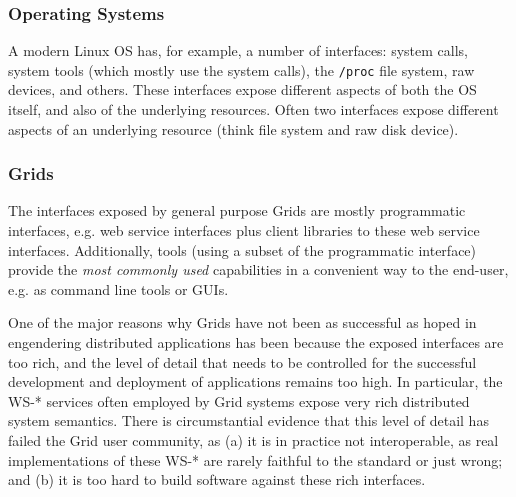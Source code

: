 \documentclass[conference,final]{IEEEtran}
\newcommand{\I}[1]{\textit{#1}}
\newcommand{\T}[1]{\texttt{#1}}
\begin{document}
  \subsubsection{Operating Systems}

   A modern Linux OS has, for example, a number of interfaces: system
   calls, system tools (which mostly use the system calls), the
   \T{/proc} file system, raw devices, and others.  These interfaces
   expose different aspects of both the OS itself, and also of the
   underlying resources.  Often two interfaces expose different
   aspects of an underlying resource (think file system and raw disk
   device). 


  \subsubsection{Grids}

   The interfaces exposed by general purpose Grids are mostly
   programmatic interfaces, e.g. web service interfaces plus client
   libraries to these web service interfaces.  Additionally, tools
   (using a subset of the programmatic interface) provide the \I{most
   commonly used} capabilities in a convenient way to the end-user,
   e.g. as command line tools or GUIs.

   One of the major reasons why Grids have not been as successful as
   hoped in engendering distributed applications has been because the
   exposed interfaces are too rich, and the level of detail that needs
   to be controlled for the successful development and deployment of
   applications remains too high.  In particular, the WS-* services
   often employed by Grid systems expose very rich distributed system
   semantics.  There is circumstantial evidence that this level of
   detail has failed the Grid user community, as (a) it is in practice
   not interoperable, as real implementations of these WS-* are rarely
   faithful to the standard or just wrong\cite{gin}; and (b) it is too
   hard to build software against these rich
   interfaces\cite{saga-gin}.

\end{document}
